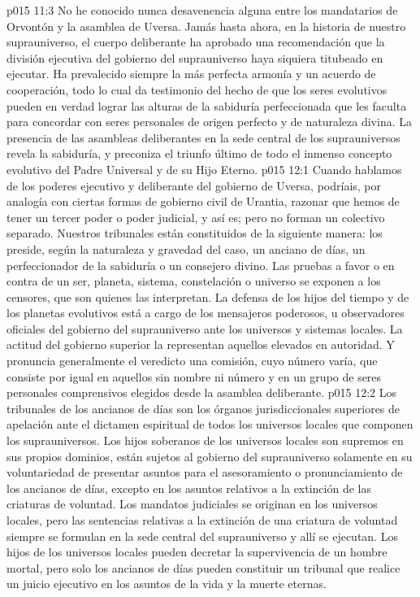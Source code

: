 \vs p015 11:3 No he conocido nunca desavenencia alguna entre los mandatarios de Orvontón y la asamblea de Uversa. Jamás hasta ahora, en la historia de nuestro suprauniverso, el cuerpo deliberante ha aprobado una recomendación que la división ejecutiva del gobierno del suprauniverso haya siquiera titubeado en ejecutar. Ha prevalecido siempre la más perfecta armonía y un acuerdo de cooperación, todo lo cual da testimonio del hecho de que los seres evolutivos pueden en verdad lograr las alturas de la sabiduría perfeccionada que les faculta para concordar con seres personales de origen perfecto y de naturaleza divina. La presencia de las asambleas deliberantes en la sede central de los suprauniversos revela la sabiduría, y preconiza el triunfo último de todo el inmenso concepto evolutivo del Padre Universal y de su Hijo Eterno.
\vs p015 12:1 Cuando hablamos de los poderes ejecutivo y deliberante del gobierno de Uversa, podríais, por analogía con ciertas formas de gobierno civil de Urantia, razonar que hemos de tener un tercer poder o poder judicial, y así es; pero no forman un colectivo separado. Nuestros tribunales están constituidos de la siguiente manera: los preside, según la naturaleza y gravedad del caso, un anciano de días, un perfeccionador de la sabiduría o un consejero divino. Las pruebas a favor o en contra de un ser, planeta, sistema, constelación o universo se exponen a los censores, que son quienes las interpretan. La defensa de los hijos del tiempo y de los planetas evolutivos está a cargo de los mensajeros poderosos, u observadores oficiales del gobierno del suprauniverso ante los universos y sistemas locales. La actitud del gobierno superior la representan aquellos elevados en autoridad. Y pronuncia generalmente el veredicto una comisión, cuyo número varía, que consiste por igual en aquellos sin nombre ni número y en un grupo de seres personales comprensivos elegidos desde la asamblea deliberante.
\vs p015 12:2 Los tribunales de los ancianos de días son los órganos jurisdiccionales superiores de apelación ante el dictamen espiritual de todos los universos locales que componen los suprauniversos. Los hijos soberanos de los universos locales son supremos en sus propios dominios, están sujetos al gobierno del suprauniverso solamente en su voluntariedad de presentar asuntos para el asesoramiento o pronunciamiento de los ancianos de días, excepto en los asuntos relativos a la extinción de las criaturas de voluntad. Los mandatos judiciales se originan en los universos locales, pero las sentencias relativas a la extinción de una criatura de voluntad siempre se formulan en la sede central del suprauniverso y allí se ejecutan. Los hijos de los universos locales pueden decretar la supervivencia de un hombre mortal, pero solo los ancianos de días pueden constituir un tribunal que realice un juicio ejecutivo en los asuntos de la vida y la muerte eternas.

